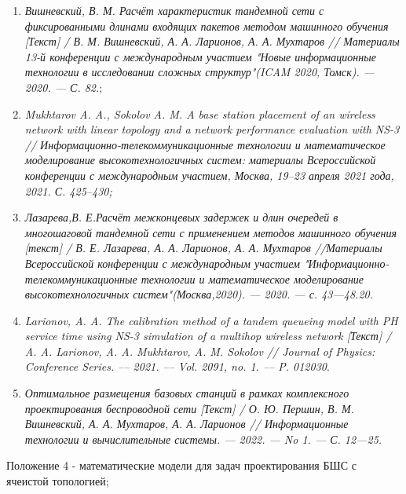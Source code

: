 \begin{frame}
\begin{minipage}[c]{1\linewidth}
\begin{enumerate}
            \item \textit{Вишневский, В. М. Расчёт характеристик тандемной сети с фиксированными длинами входящих пакетов методом машинного обучения [Текст] / В. М. Вишневский, А. А. Ларионов, А. А. Мухтаров // Материалы 13-й конференции с международным участием "Новые информационные технологии в исследовании сложных структур"(ICAM 2020, Томск). — 2020. — С. 82.};
            \item \textit{Mukhtarov A. A., Sokolov A. M. A base station placement of an wireless network with linear topology and a network performance evaluation with NS-3 // Информационно-телекоммуникационные технологии и математическое моделирование высокотехнологичных систем: материалы Всероссийской конференции с международным участием, Москва, 19–23 апреля 2021 года, 2021. С. 425–430;}
            \item \textit{Лазарева,В. Е.Расчёт межконцевых задержек и длин очередей в многошаговой тандемной сети с применением методов машинного обучения [текст] / В. Е. Лазарева, А. А. Ларионов, А. А. Мухтаров //Материалы Всероссийской конференции с международным уча­стием "Информационно-телекоммуникационные технологии и мате­матическое моделирование высокотехнологичных систем"(Москва,2020). — 2020. — с. 43—48.20.}
            \item \textit{Larionov, A. A. The calibration method of a tandem queueing model with PH service time using NS-3 simulation of a multihop wireless network [Текст] / A. A. Larionov, A. A. Mukhtarov, A. M. Sokolov // Journal of Physics: Conference Series. –– 2021. –– Vol. 2091, no. 1. –– P. 012030}.
            \item \textit{Оптимальное размещения базовых станций в рамках комплексного проектирования беспроводной сети [Текст] / О. Ю. Першин, В. М. Вишневский, А. А. Мухтаров, А. А. Ларионов // Информационные технологии и вычислительные системы. — 2022. — No 1. — С. 12—25.}
        \end{enumerate}
    \end{minipage}

\end{frame}

\begin{frame}
    \begin{center}
        {Положение 4 - математические модели для задач проектирования БШС с ячеистой
        топологией;}
    \end{center}
\end{frame}



